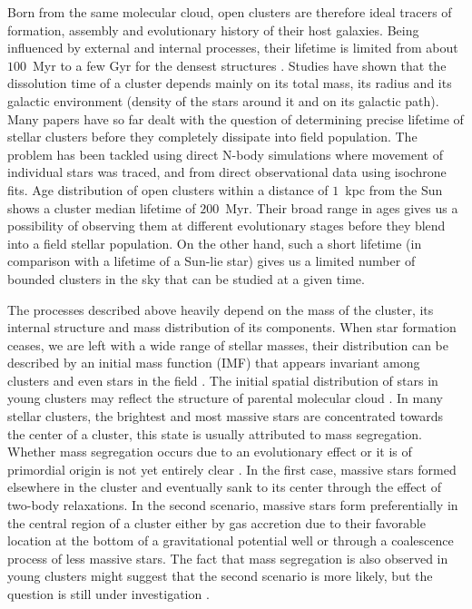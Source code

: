 Born from the same molecular cloud, open clusters are therefore ideal tracers of formation, assembly and evolutionary history of their host galaxies. Being influenced by external and internal processes, their lifetime is limited from about $100$~Myr to a few Gyr for the densest structures \citep{1998A&A...337..363P, 2013MNRAS.434.2509M}. Studies have shown that the dissolution time of a cluster depends mainly on its total mass, its radius and its galactic environment (density of the stars around it and on its galactic path). Many papers have so far dealt with the question of determining precise lifetime of stellar clusters before they completely dissipate into field population. The problem has been tackled using direct N-body simulations \citep{1998A&A...337..363P} where movement of individual stars was traced, and from direct observational data \citep{1971Ap&SS..13..300W, 1988IAUS..126..393W, 2019MNRAS.487.2385M, 2019A&A...623A.108B} using isochrone fits. Age distribution of open clusters within a distance of $1$~kpc from the Sun shows a cluster median lifetime of $200$~Myr. Their broad range in ages gives us a possibility of observing them at different evolutionary stages \citep{2006BASI...34..153C, 2007A&A...468..139P} before they blend \citep{2001A&A...366..827B} into a field stellar population. On the other hand, such a short lifetime (in comparison with a lifetime of a Sun-lie star) gives us a limited number of bounded clusters in the sky that can be studied at a given time.

The processes described above heavily depend on the mass of the cluster, its internal structure and mass distribution of its components. When star formation ceases, we are left with a wide range of stellar masses, their distribution can be described by an initial mass function (IMF) \citep{1955ApJ...121..161S, 1986FCPh...11....1S, 2003PASP..115..763C} that appears invariant among clusters and even stars in the field \citep{2001MNRAS.322..231K}. The initial spatial distribution of stars in young clusters may reflect the structure of parental molecular cloud \citep{2015MNRAS.448.1847H}. In many stellar clusters, the brightest and most massive stars are concentrated towards the center of a cluster, this state is usually attributed to mass segregation. Whether mass segregation occurs due to an evolutionary effect or it is of primordial origin is not yet entirely clear \citep{1998A&A...333..897R, 1998MNRAS.295..691B, 2002MNRAS.331..245D, 2003A&A...405..525B}. In the first case, massive stars formed elsewhere in the cluster and eventually sank to its center through the effect of two-body relaxations. In the second scenario, massive stars form preferentially in the central region of a cluster either by gas accretion due to their favorable location at the bottom of a gravitational potential well or through a coalescence process of less massive stars. The fact that mass segregation is also observed in young clusters might suggest that the second scenario is more likely, but the question is still under investigation \citep{2018MNRAS.473..849D}.

